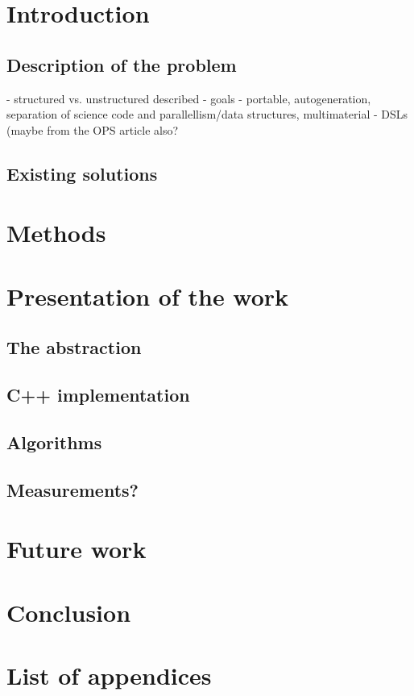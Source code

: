 \documentclass[fontsize=11pt, appendixprefix=true]{scrreprt}
\begin{document}
\chapter{Introduction}

\section{Description of the problem}

- structured vs. unstructured described
- goals - portable, autogeneration, separation of science code and parallellism/data structures, multimaterial
- DSLs (maybe from the OPS article also?

\section{Existing solutions}

\chapter{Methods}

\chapter{Presentation of the work}

\section{The abstraction}
\section{C++ implementation}
\section{Algorithms}
\section{Measurements?}

\chapter{Future work}

\chapter{Conclusion}

\printbibliography
\appendix
\chapter{List of appendices}
\end{document}
